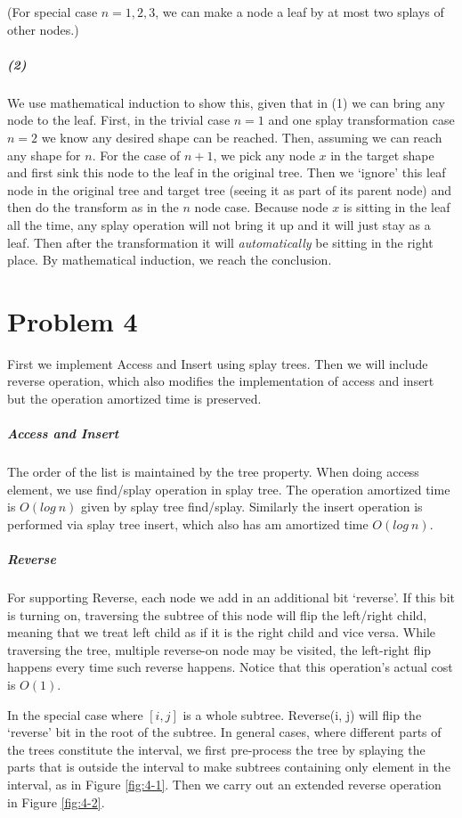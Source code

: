 \documentclass[10pt,letter]{article}
\begin{document}
(For special case $n = 1, 2, 3$, we can make a node a leaf by at most two splays of other nodes.) 

\subparagraph{(2)} 
We use mathematical induction to show this, given that in (1) we can bring any node to the leaf. First, in the trivial case $n=1$ and one splay transformation case $n=2$ we know any desired shape can be reached. Then, assuming we can reach any shape for $n$. For the case of $n+1$, we pick any node $x$ in the target shape and first sink this node to the leaf in the original tree. Then we `ignore' this leaf node in the original tree and target tree (seeing it as part of its parent node) and then do the transform as in the $n$ node case. Because node $x$ is sitting in the leaf all the time, any splay operation will not bring it up and it will just stay as a leaf. Then after the transformation it will \emph{automatically} be sitting in the right place. By mathematical induction, we reach the conclusion.

\pagebreak

\section*{Problem 4}
First we implement Access and Insert using splay trees. Then we will include reverse operation, which also modifies the implementation of access and insert but the operation amortized time is preserved. 
\subparagraph{Access and Insert} The order of the list is maintained by the tree property. When doing access element, we use find/splay operation in splay tree. The operation amortized time is $O(log\:n)$ given by splay tree find/splay. Similarly the insert operation is performed via splay tree insert, which also has am amortized time $O(log\:n)$.
\subparagraph{Reverse} For supporting Reverse, each node we add in an additional bit `reverse'. If this bit is turning on, traversing the subtree of this node will flip the left/right child, meaning that we treat left child as if it is the right child and vice versa. While traversing the tree, multiple reverse-on node may be visited, the left-right flip happens every time such reverse happens. Notice that this operation's actual cost is $O(1)$.

In the special case where $[i, j]$ is a whole subtree. Reverse(i, j) will flip the `reverse' bit in the root of the subtree. In general cases, where different parts of the trees constitute the interval, we first pre-process the tree by splaying the parts that is outside the interval to make subtrees containing only element in the interval, as in Figure \ref{fig:4-1}. Then we carry out an extended reverse operation in Figure \ref{fig:4-2}. 
\end{document}
